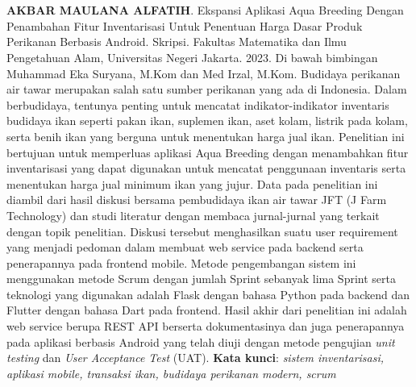 \chapter*{}

\begin{spacing}{1}
\textbf{AKBAR MAULANA ALFATIH}. Ekspansi Aplikasi Aqua Breeding Dengan Penambahan Fitur Inventarisasi Untuk Penentuan Harga Dasar Produk Perikanan Berbasis Android. Skripsi. Fakultas Matematika dan Ilmu Pengetahuan Alam, Universitas Negeri Jakarta. 2023. Di bawah bimbingan Muhammad Eka Suryana, M.Kom dan Med Irzal, M.Kom.
\newline
\newline
Budidaya perikanan air tawar merupakan salah satu sumber perikanan yang ada di Indonesia. Dalam berbudidaya, tentunya penting untuk mencatat indikator-indikator inventaris budidaya ikan seperti pakan ikan, suplemen ikan, aset kolam, listrik pada kolam, serta benih ikan yang berguna untuk menentukan harga jual ikan. Penelitian ini bertujuan untuk  memperluas aplikasi Aqua Breeding dengan menambahkan fitur inventarisasi yang dapat digunakan untuk mencatat penggunaan inventaris serta menentukan harga jual minimum ikan yang jujur. Data pada penelitian ini diambil dari hasil diskusi bersama pembudidaya ikan air tawar JFT (J Farm Technology) dan studi literatur dengan membaca jurnal-jurnal yang terkait dengan topik penelitian. Diskusi tersebut menghasilkan suatu user requirement yang menjadi pedoman dalam membuat web service pada backend serta penerapannya pada frontend mobile. Metode pengembangan sistem ini menggunakan metode Scrum dengan jumlah Sprint sebanyak lima Sprint serta teknologi yang digunakan adalah Flask dengan bahasa Python pada backend dan Flutter dengan bahasa Dart pada frontend. Hasil akhir dari penelitian ini adalah web service berupa REST API berserta dokumentasinya dan juga penerapannya pada aplikasi berbasis Android yang telah diuji dengan metode pengujian \textit{unit testing} dan \textit{User Acceptance Test} (UAT).
\newline
\newline
\noindent \textbf{Kata kunci}: \textit{sistem inventarisasi, aplikasi mobile, transaksi ikan, budidaya perikanan modern, scrum}
\end{spacing}